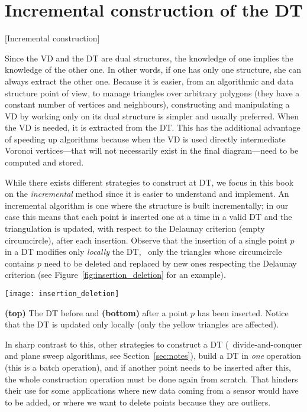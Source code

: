 %
\section{Incremental construction of the DT}[Incremental construction]%
\label{sec:dtconstruction}

Since the VD and the DT are dual structures, the knowledge of one implies the knowledge of the other one. 
In other words, if one has only one structure, she can always extract the other one. 
Because it is easier, from an algorithmic and data structure point of view, to manage triangles over arbitrary polygons (they have a constant number of vertices and neighbours), constructing and manipulating a VD by working only on its dual structure is simpler and usually preferred. 
When the VD is needed, it is extracted from the DT\@. 
This has the additional advantage of speeding up algorithms because when the VD is used directly intermediate Voronoi vertices---that will not necessarily exist in the final diagram---need to be computed and stored.

%

While there exists different strategies to construct at DT, we focus in this book on the \emph{incremental} method since it is easier to understand and implement.
An incremental algorithm is one where the structure is built incrementally; in our case this means that each point is inserted one at a time in a valid DT and the triangulation is updated, with respect to the Delaunay criterion (empty circumcircle), after each insertion. 
Observe that the insertion of a single point $p$ in a DT modifies only \emph{locally} the DT, \ie\ only the triangles whose circumcircle contains $p$ need to be deleted and replaced by new ones respecting the Delaunay criterion (see Figure~\ref{fig:insertion_deletion} for an example). 
\begin{marginfigure}
  \centering
  \texttt{[image: insertion\_deletion]}
  \caption{\textbf{(top)} The DT before and \textbf{(bottom)} after a point $p$ has been inserted. Notice that the DT is updated only locally (only the yellow triangles are affected).}%
\label{fig:insertion_deletion}
\end{marginfigure}

%

In sharp contrast to this, other strategies to construct a DT (\eg\ divide-and-conquer and plane sweep algorithms, see Section~\ref{sec:notes}), build a DT in \emph{one} operation (this is a batch operation), and if another point needs to be inserted after this, the whole construction operation must be done again from scratch. 
That hinders their use for some applications where new data coming from a sensor would have to be added, or where we want to delete points because they are outliers.

